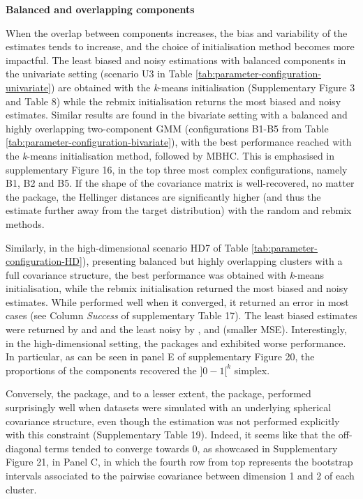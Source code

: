 \textbf{Balanced and overlapping components}

When the overlap between components increases, the bias and variability of the estimates tends to increase, and the choice of initialisation method becomes more impactful.
The least biased and noisy estimations with balanced components in the univariate setting (scenario U3 in Table
\ref{tab:parameter-configuration-univariate}) are obtained with
the \emph{k}-means initialisation (Supplementary Figure
3 and Table 8) while the rebmix initialisation returns the most biased and noisy
estimates. Similar results are found in the bivariate setting with a balanced and highly overlapping two-component GMM (configurations B1-B5 from Table \ref{tab:parameter-configuration-bivariate}), with the best performance reached with the \emph{k}-means initialisation method, followed by MBHC. This is emphasised in supplementary Figure 16, in the top three most complex configurations, namely B1, B2 and B5. If the shape of the covariance matrix is well-recovered, no matter the package, the Hellinger distances are significantly higher (and thus the estimate further away from the target distribution) with the random and rebmix methods.

Similarly, in the high-dimensional scenario HD7 of Table \ref{tab:parameter-configuration-HD}), presenting balanced but highly overlapping clusters with a full covariance structure, the best performance was obtained with \emph{k}-means initialisation, while the rebmix initialisation returned the most biased and noisy estimates. While  performed well when it converged, it returned an error in most cases (see Column \emph{Success} of supplementary Table 17). The least biased estimates were returned by  and  and the least noisy by ,  and  (smaller MSE). Interestingly, in the high-dimensional setting, the packages  and  exhibited worse performance. In particular, as can be seen in panel E of supplementary Figure 20, the proportions of the components recovered the \(]0-1[^k\) simplex.

Conversely, the  package, and to a lesser extent, the  package, performed surprisingly well when datasets were simulated with an underlying spherical covariance structure, even though the estimation was not performed explicitly with this constraint (Supplementary Table 19). Indeed, it seems like that the off-diagonal terms tended to converge towards 0, as showcased in Supplementary Figure 21, in Panel C, in which the fourth row from top represents the bootstrap intervals associated to the pairwise covariance between dimension 1 and 2 of each cluster.

